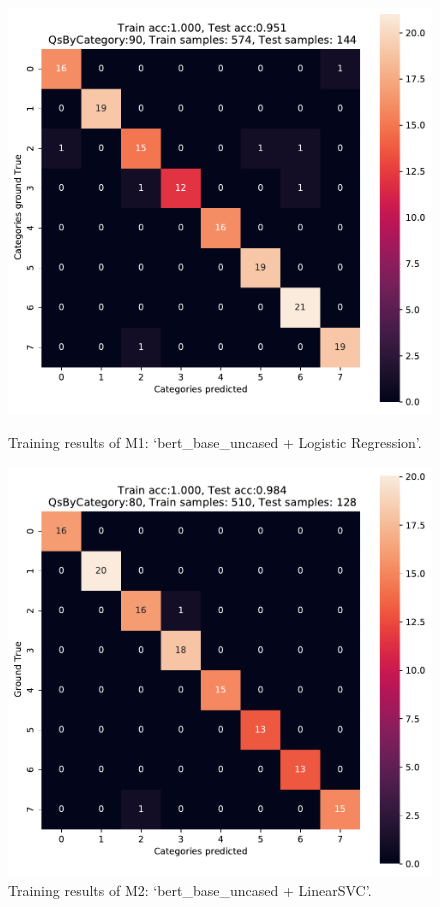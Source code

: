 \begin{figure}[ht!]
    \centering
    \begin{minipage}[c]{0.49\linewidth}
        \includegraphics[width=\textwidth]{images/training/training_m1_v2.pdf}
        \caption{Training results of M1: `bert\_base\_uncased + Logistic Regression'.}
        \label{fig:m1}
    \end{minipage}
    \begin{minipage}[c]{0.49\linewidth}
        \includegraphics[width=\textwidth]{images/training/training_m2_v2.pdf}
        \caption{Training results of M2: `bert\_base\_uncased + LinearSVC'.}
        \label{fig:m2}
    \end{minipage}
\end{figure}

